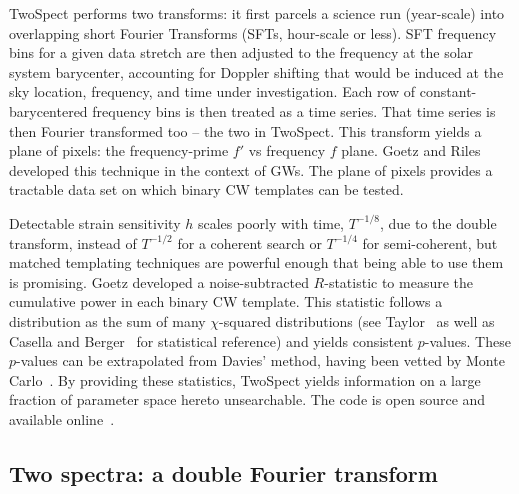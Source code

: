TwoSpect performs two transforms: it first parcels a science run (year-scale) into overlapping short Fourier Transforms (SFTs, hour-scale or less).
SFT frequency bins for a given data stretch are then adjusted to the frequency at the solar system barycenter, accounting for Doppler shifting that would be induced at the sky location, frequency, and time under investigation.
Each row of constant-barycentered frequency bins is then treated as a time series.
That time series is then Fourier transformed too -- the two in TwoSpect.
This transform yields a plane of pixels: the frequency-prime $f'$ vs frequency $f$ plane.
Goetz and Riles~\cite{GoetzTwoSpectMethods2011,GoetzThesis} developed this technique in the context of GWs.
The plane of pixels provides a tractable data set on which binary CW templates can be tested.

Detectable strain sensitivity $h$ scales poorly with time, $T^{-1/8}$, due to the double transform, instead of $T^{-1/2}$ for a coherent search or $T^{-1/4}$ for semi-coherent, but matched templating techniques are powerful enough that being able to use them is promising.
Goetz developed a noise-subtracted $R$-statistic to measure the cumulative power in each binary CW template.
This statistic follows a distribution as the sum of many $\chi$-squared distributions (see Taylor~\cite{taylor} as well as Casella and Berger~\cite{CasellaBerger2001} for statistical reference) and yields consistent $p$-values.
These $p$-values can be extrapolated from Davies' method, having been vetted by Monte Carlo~\cite{GoetzTwoSpectMethods2011}.
By providing these statistics, TwoSpect yields information on a large fraction of parameter space hereto unsearchable.
The code is open source and available online~\cite{LALAPPSrepo}.



            \subsection{Two spectra: a double Fourier transform}
            \label{two_spectra}


